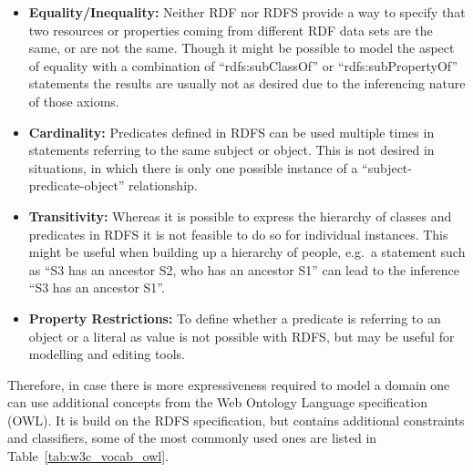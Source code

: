 \begin{itemize}
	\item \textbf{Equality/Inequality:} Neither \gls{RDF} nor \gls{RDFS} provide a way to specify that two resources or properties coming from different \gls{RDF} data sets are the same, or are not the same. Though it might be possible to model the aspect of equality with a combination of ``rdfs:subClassOf'' or ``rdfs:subPropertyOf'' statements the results are usually not as desired due to the inferencing nature of those axioms.
	\item \textbf{Cardinality:} Predicates defined in \gls{RDFS} can be used multiple times in statements referring to the same subject or object. This is not desired in situations, in which there is only one possible instance of a ``subject-predicate-object'' relationship.
	\item \textbf{Transitivity:} Whereas it is possible to express the hierarchy of classes and predicates in \gls{RDFS} it is not feasible to do so for individual instances. This might be useful when building up a hierarchy of people, e.g.\ a statement such as ``S3 has an ancestor S2, who has an ancestor S1'' can lead to the inference ``S3 has an ancestor S1''.
	\item \textbf{Property Restrictions:} To define whether a predicate is referring to an object or a literal as value is not possible with \gls{RDFS}, but may be useful for modelling and editing tools.
\end{itemize}

Therefore, in case there is more expressiveness required to model a domain one can use additional concepts from the Web Ontology Language specification (\gls{OWL}). It is build on the \gls{RDFS} specification, but contains additional constraints and classifiers, some of the most commonly used ones are listed in Table~\ref{tab:w3c_vocab_owl}. \@

